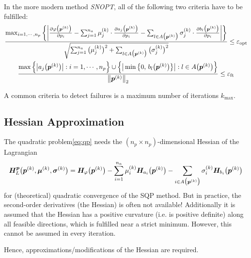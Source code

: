 			In the more modern method \emph{SNOPT}, all of the following two criteria have to be fulfilled:
			\begin{gather*}
				\frac{
					\max_{i = 1, \cdots, n_p} \bigg\{ \bigg\lvert \pdv{\varphi\big(\bm{p}^{(k)}\big)}{p_i} - \sum_{j = 1}^{n_a} \mu_j^{(k)} \cdot \pdv{a_j\big(\bm{p}^{(k)}\big)}{p_i} - \sum_{l \in A\big(\bm{p}^{(k)}\big)} \sigma_j^{(k)} \cdot \pdv{b_l\big(\bm{p}^{(k)}\big)}{p_i} \bigg\rvert \bigg\}
				}{
					\sqrt{\sum_{j = 1}^{n_a} \big( \mu_j^{(k)} \big)^2 + \sum_{l \in A\big(\bm{p}^{(k)}\big)} \big(\sigma_j^{(k)}\big)^2}
				} \leq \varepsilon_\mathrm{opt} \\
				\frac{\max\Big\{ \big\lvert a_j\big(\bm{p}^{(k)}\big) \big\rvert : i = 1, \cdots, n_p \Big\} \cup \Big\{ \big\lvert \min\big\{ 0,\, b_l\big(\bm{p}^{(k)}\big) \big\} \big\rvert : l \in A\big(\bm{p}^{(k)}\big) \Big\}}{\big\lVert \bm{p}^{(k)} \big\rVert_2} \leq \varepsilon_\mathrm{ft}
			\end{gather*}

			A common criteria to detect failures is a maximum number of iterations \( k_\mathrm{max} \).

		\subsection{Hessian Approximation}
			The quadratic problem\eqref{eq:qp} needs the \( (n_p \times n_p) \)-dimensional Hessian of the Lagrangian
			\begin{align*}
				\bm{H}_L^{\bm{p}}\big(\bm{p}^{(k)}, \bm{\mu}^{(k)}, \bm{\sigma}^{(k)}\big) = \bm{H}_\varphi\big(\bm{p}^{(k)}\big) - \sum_{i = 1}^{n_a} \mu_i^{(k)} \bm{H}_{a_i}\big(\bm{p}^{(k)}\big) - \sum_{i \in A\big(\bm{p}^{(k)}\big)} \sigma_i^{(k)} \bm{H}_{b_i}\big(\bm{p}^{(k)}\big)
			\end{align*}
			for (theoretical) quadratic convergence of the SQP method. But in practice, the second-order derivatives (the Hessian) is often not available! Additionally it is assumed that the Hessian has a positive curvature (i.e. is positive definite) along all feasible directions, which is fulfilled near a strict minimum. However, this cannot be assumed in every iteration.

			Hence, approximations/modifications of the Hessian are required.

